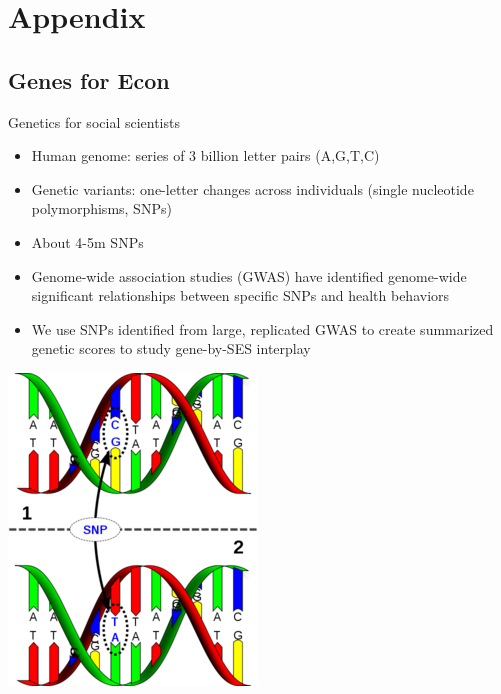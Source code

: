 \documentclass[10pt,compress,xcolor=dvipsnames]{beamer}    %
\newcounter{ex}
\newcommand{\1}[1]{\mathrm{1\hspace*{-2.5pt}l}[#1]}	%
\begin{document}
\appendix
\section{Appendix}
\subsection{Genes for Econ}


\begin{frame}{Genetics for social scientists} \label{frame:genetics}

    \begin{minipage}{.7\textwidth}
\begin{itemize}
	\item Human genome: series of 3 billion letter pairs (A,G,T,C)
	\item Genetic variants: one-letter changes across individuals (single nucleotide polymorphisms, SNPs)
	\item About 4-5m SNPs \cite{1000Genomes2015}
	\item Genome-wide association studies (GWAS) have identified genome-wide significant relationships between specific SNPs and health behaviors
	\item We use SNPs identified from large, replicated GWAS to create summarized genetic scores to study gene-by-SES interplay \hyperlink{fig:manhattan}{}
\end{itemize}
    \end{minipage}
    \begin{minipage}{.2\textwidth}
      \includegraphics[scale=0.4]{SNP2}
    \end{minipage}

\end{frame}
\end{document}

